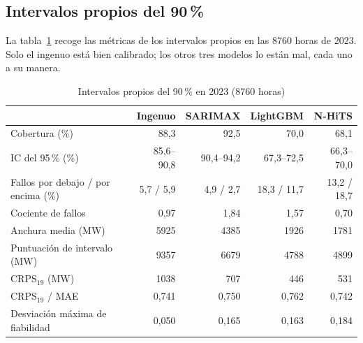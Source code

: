 \subsection{Intervalos propios del 90\,\%}\label{sec:cal-propios}

La tabla~\ref{tab:cal-propios} recoge las métricas de los intervalos propios en
las 8760 horas de 2023. Solo el ingenuo está bien calibrado; los otros tres
modelos lo están mal, cada uno a su manera.

\begin{table}[htbp]
	\centering
	\caption{Intervalos propios del 90\,\% en 2023 (8760 horas)}
	\label{tab:cal-propios}
	\small
	\begin{tabular}{lrrrr}
		\hline
		 & \textbf{Ingenuo} & \textbf{SARIMAX} & \textbf{LightGBM} & \textbf{N-HiTS} \\
		\hline
		Cobertura (\%) & 88,3 & 92,5 & 70,0 & 68,1 \\
		\quad IC del 95\,\% (\%) & 85,6--90,8 & 90,4--94,2 & 67,3--72,5 & 66,3--70,0 \\
		Fallos por debajo / por encima (\%) & 5,7 / 5,9 & 4,9 / 2,7 & 18,3 / 11,7 & 13,2 / 18,7 \\
		Cociente de fallos & 0,97 & 1,84 & 1,57 & 0,70 \\
		Anchura media (MW) & 5925 & 4385 & 1926 & 1781 \\
		Puntuación de intervalo (MW) & 9357 & 6679 & 4788 & 4899 \\
		CRPS$_{19}$ (MW) & 1038 & 707 & 446 & 531 \\
		CRPS$_{19}$ / MAE & 0,741 & 0,750 & 0,762 & 0,742 \\
		Desviación máxima de fiabilidad & 0,050 & 0,165 & 0,163 & 0,184 \\
		\hline
	\end{tabular}
\end{table}


